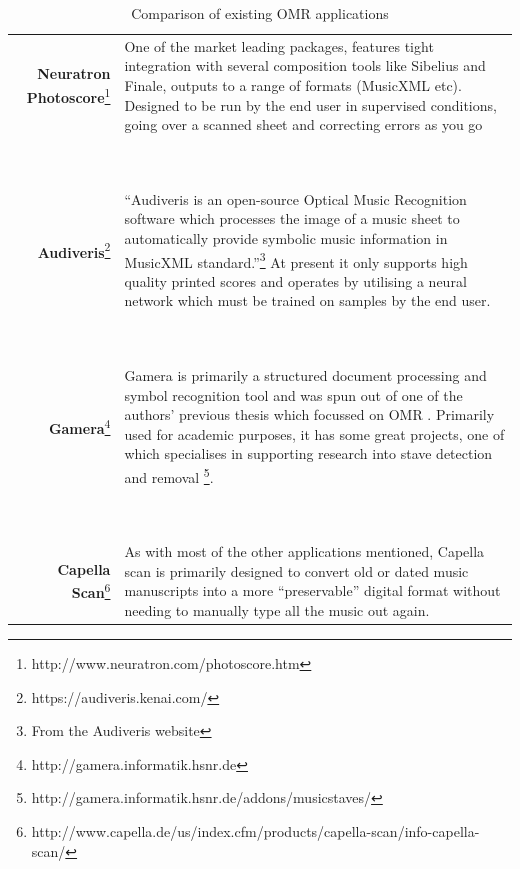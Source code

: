 \begin{table}[h]
\caption{Comparison of existing OMR applications}
\begin{tabularx}{\linewidth}{ r | X }
    \textbf{Neuratron Photoscore}\footnote{http://www.neuratron.com/photoscore.htm} & One of the market leading packages, features tight integration with several composition tools like Sibelius and Finale, outputs to a range of formats (MusicXML etc). Designed to be run by the end user in supervised conditions, going over a scanned sheet and correcting errors as you go \\

    \ & \ \\
    \hline
    \ & \ \\

    \textbf{Audiveris}\footnote{https://audiveris.kenai.com/} & ``Audiveris is an open-source Optical Music Recognition software which processes the image of a music sheet to automatically provide symbolic music information in MusicXML standard.''\footnote{From the Audiveris website} \newline \newline At present it only supports high quality printed scores and operates by utilising a neural network which must be trained on samples by the end user. \\

    \ & \ \\
    \hline
    \ & \ \\

    \textbf{Gamera}\footnote{http://gamera.informatik.hsnr.de} & Gamera is primarily a structured document processing and symbol recognition tool \parencite{macmillan2002gamera} and was spun out of one of the authors' previous thesis which focussed on OMR \parencite{fujinaga1996adaptive}. Primarily used for academic purposes, it has some great projects, one of which specialises in supporting research into stave detection and removal \footnote{http://gamera.informatik.hsnr.de/addons/musicstaves/}. \\

    \ & \ \\
    \hline
    \ & \ \\

    \textbf{Capella Scan}\footnote{http://www.capella.de/us/index.cfm/products/capella-scan/info-capella-scan/} & As with most of the other applications mentioned, Capella scan is primarily designed to convert old or dated music manuscripts into a more ``preservable'' digital format without needing to manually type all the music out again. \\

\end{tabularx}
\end{table}
